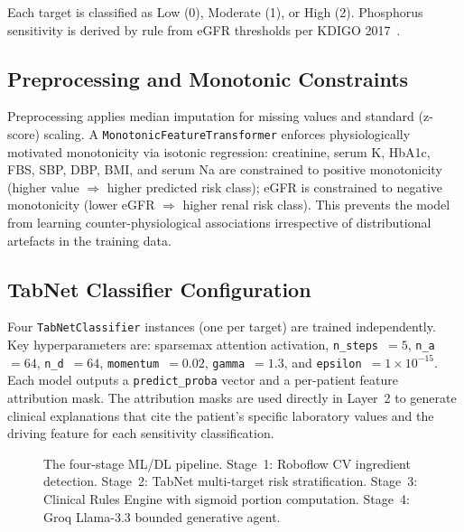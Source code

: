 \documentclass[journal]{IEEEtran}
\begin{document}
Each target is classified as Low (0), Moderate (1), or High (2).
Phosphorus sensitivity is derived by rule from eGFR thresholds per
KDIGO 2017~\cite{kdigo2012}.

\subsection{Preprocessing and Monotonic Constraints}

Preprocessing applies median imputation for missing values and standard
(z-score) scaling. A \texttt{MonotonicFeatureTransformer} enforces
physiologically motivated monotonicity via isotonic regression:
creatinine, serum K, HbA1c, FBS, SBP, DBP, BMI, and serum Na are
constrained to positive monotonicity (higher value $\Rightarrow$ higher
predicted risk class); eGFR is constrained to negative monotonicity
(lower eGFR $\Rightarrow$ higher renal risk class). This prevents the
model from learning counter-physiological associations irrespective of
distributional artefacts in the training data.

\subsection{TabNet Classifier Configuration}

Four \texttt{TabNetClassifier} instances (one per target) are trained
independently. Key hyperparameters are: sparsemax attention activation,
\texttt{n\_steps}~$= 5$, \texttt{n\_a}~$= 64$, \texttt{n\_d}~$= 64$,
\texttt{momentum}~$= 0.02$, \texttt{gamma}~$= 1.3$, and
\texttt{epsilon}~$= 1 \times 10^{-15}$.
Each model outputs a \texttt{predict\_proba} vector and a per-patient
feature attribution mask. The attribution masks are used directly in
Layer~2 to generate clinical explanations that cite the patient's
specific laboratory values and the driving feature for each sensitivity
classification.

\begin{figure}[!t]
    \centering
    \caption{The four-stage ML/DL pipeline. Stage~1: Roboflow CV
    ingredient detection. Stage~2: TabNet multi-target risk stratification.
    Stage~3: Clinical Rules Engine with sigmoid portion computation.
    Stage~4: Groq Llama-3.3 bounded generative agent.}
    \label{fig:mlpipeline}
\end{figure}
\end{document}
